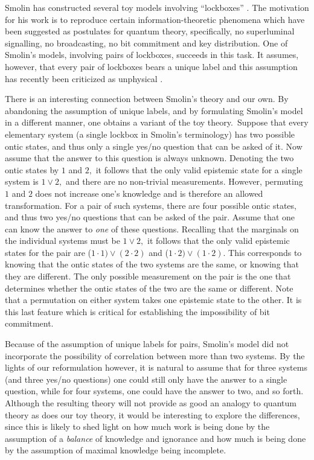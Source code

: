 \documentclass[pra,twocolumn,nofootinbib,showpacs]{revtex4}
\begin{document}
Smolin has constructed several toy models involving ``lockboxes'' \cite%
{Smolin}. The motivation for his work is to reproduce certain
information-theoretic phenomena which have been suggested as postulates for
quantum theory, specifically, no superluminal signalling, no broadcasting,
no bit commitment and key distribution. One of Smolin's models, involving
pairs of lockboxes, succeeds in this task. It assumes, however, that every
pair of lockboxes bears a unique label and this assumption has recently been
criticized as unphysical \cite{HalvorsonBub}.

There is an interesting connection between Smolin's theory and our own. By
abandoning the assumption of unique labels, and by formulating Smolin's
model in a different manner, one obtains a variant of the toy theory.\emph{\
}Suppose that every elementary system (a single lockbox in Smolin's
terminology) has two possible ontic states, and thus only a single yes/no
question that can be asked of it. Now assume that the answer to this
question is always unknown. Denoting the two ontic states by $1$ and $2,$ it
follows that the only valid epistemic state for a single system is $1\vee 2,$
and there are no non-trivial measurements. However, permuting $1$ and $2$
does not increase one's knowledge and is therefore an allowed
transformation. For a pair of such systems, there are four possible ontic
states, and thus two yes/no questions that can be asked of the pair. Assume
that one can know the answer to \emph{one} of these questions. Recalling
that the marginals on the individual systems must be $1\vee 2,$ it follows
that the only valid epistemic states for the pair are ($1\cdot 1)\vee
(2\cdot 2)$ and ($1\cdot 2)\vee (1\cdot 2).$ This corresponds to knowing
that the ontic states of the two systems are the same, or knowing that they
are different. The only possible measurement on the pair is the one that
determines whether the ontic states of the two are the same or different.
Note that a permutation on either system takes one epistemic state to the
other. It is this last feature which is critical for establishing the
impossibility of bit commitment.

Because of the assumption of unique labels for pairs, Smolin's model did not
incorporate the possibility of correlation between more than two systems. By
the lights of our reformulation however, it is natural to assume that for
three systems (and three yes/no questions) one could still only have the
answer to a single question, while for four systems, one could have the
answer to two, and so forth. Although the resulting theory will not provide
as good an analogy to quantum theory as does our toy theory, it would be
interesting to explore the differences, since this is likely to shed light
on how much work is being done by the assumption of a \emph{balance} of
knowledge and ignorance and how much is being done by the assumption of
maximal knowledge being incomplete.
\end{document}
